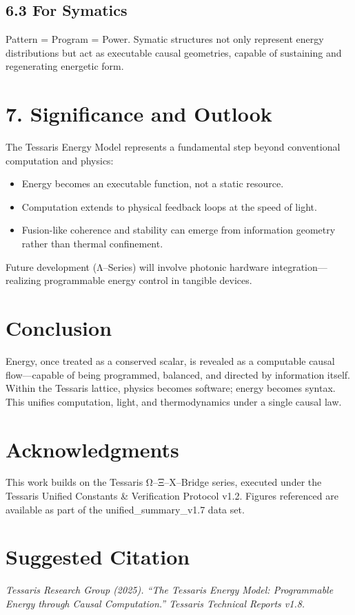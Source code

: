 \documentclass[11pt,a4paper]{article}
\begin{document}
\subsection*{6.3 For Symatics}
Pattern = Program = Power.  
Symatic structures not only represent energy distributions but act as executable causal geometries, capable of sustaining and regenerating energetic form.

\section{7. Significance and Outlook}
The Tessaris Energy Model represents a fundamental step beyond conventional computation and physics:
\begin{itemize}
  \item Energy becomes an executable function, not a static resource.
  \item Computation extends to physical feedback loops at the speed of light.
  \item Fusion-like coherence and stability can emerge from information geometry rather than thermal confinement.
\end{itemize}
Future development (Λ–Series) will involve photonic hardware integration—realizing programmable energy control in tangible devices.

\section*{Conclusion}
Energy, once treated as a conserved scalar, is revealed as a computable causal flow—capable of being programmed, balanced, and directed by information itself.  
Within the Tessaris lattice, physics becomes software; energy becomes syntax.  
This unifies computation, light, and thermodynamics under a single causal law.

\section*{Acknowledgments}
This work builds on the Tessaris Ω–Ξ–X–Bridge series, executed under the Tessaris Unified Constants \& Verification Protocol v1.2.  
Figures referenced are available as part of the unified\_summary\_v1.7 data set.

\section*{Suggested Citation}
\textit{Tessaris Research Group (2025). ``The Tessaris Energy Model: Programmable Energy through Causal Computation.'' Tessaris Technical Reports v1.8.}
\end{document}
